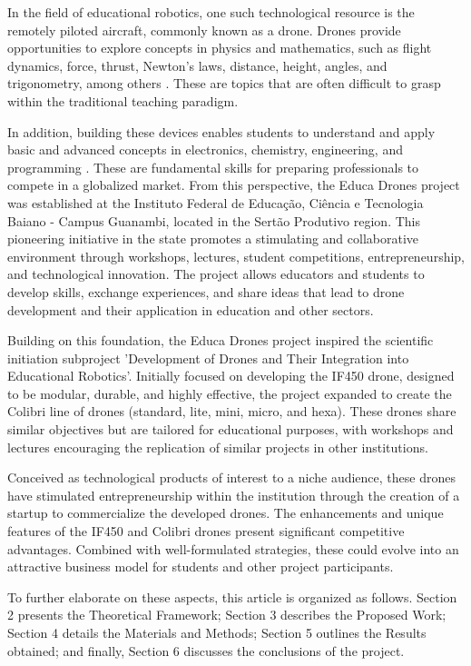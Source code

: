 \documentclass[conference]{IEEEtran}
\begin{document}
In the field of educational robotics, one such technological resource is the remotely piloted aircraft, commonly known as a drone. Drones provide opportunities to explore concepts in physics and mathematics, such as flight dynamics, force, thrust, Newton’s laws, distance, height, angles, and trigonometry, among others \cite{b11}. These are topics that are often difficult to grasp within the traditional teaching paradigm.

In addition, building these devices enables students to understand and apply basic and advanced concepts in electronics, chemistry, engineering, and programming \cite{b12}. These are fundamental skills for preparing professionals to compete in a globalized market. From this perspective, the Educa Drones project was established at the Instituto Federal de Educação, Ciência e Tecnologia Baiano - Campus Guanambi, located in the Sertão Produtivo region. This pioneering initiative in the state promotes a stimulating and collaborative environment through workshops, lectures, student competitions, entrepreneurship, and technological innovation. The project allows educators and students to develop skills, exchange experiences, and share ideas that lead to drone development and their application in education and other sectors.

Building on this foundation, the Educa Drones project inspired the scientific initiation subproject 'Development of Drones and Their Integration into Educational Robotics'. Initially focused on developing the IF450 drone, designed to be modular, durable, and highly effective, the project expanded to create the Colibri line of drones (standard, lite, mini, micro, and hexa). These drones share similar objectives but are tailored for educational purposes, with workshops and lectures encouraging the replication of similar projects in other institutions.

Conceived as technological products of interest to a niche audience, these drones have stimulated entrepreneurship within the institution through the creation of a startup to commercialize the developed drones. The enhancements and unique features of the IF450 and Colibri drones present significant competitive advantages. Combined with well-formulated strategies, these could evolve into an attractive business model for students and other project participants.

To further elaborate on these aspects, this article is organized as follows. Section 2 presents the Theoretical Framework; Section 3 describes the Proposed Work; Section 4 details the Materials and Methods; Section 5 outlines the Results obtained; and finally, Section 6 discusses the conclusions of the project.
\end{document}
